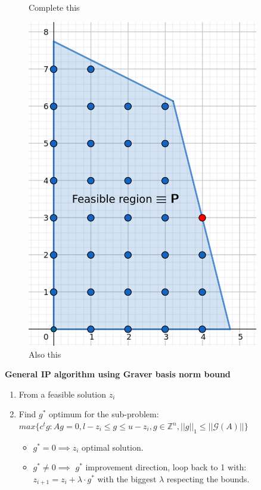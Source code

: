 \begin{figure}[h]
\begin{minipage}[b]{0.45\textwidth}
    \caption{Complete this}
\end{minipage}
\hfill
\begin{minipage}[b]{0.45\textwidth}
    \centering
    \includegraphics[width=0.9\textwidth]{images/IP(12).png}
    \caption{Also this}
\end{minipage}
\end{figure}

\newpage
\textbf{General IP algorithm using Graver basis norm bound}
\vspace{-8pt}
\begin{enumerate}
    \item From a feasible solution $z_i$
    \item Find $g^*$ optimum for the sub-problem: \vspace{4pt}\\
          $max\{c^tg : Ag = 0, l-z_i \leq g \leq u-z_i, g \in \mathbb{Z}^n, ||g||_1 \leq ||\mathcal{G}(A)|| \}$ \vspace{4pt}
    \begin{itemize}
        \item $g^* = 0 \implies z_i$ optimal solution.
        \item $g^* \neq 0 \implies$ $g^*$ improvement direction, loop back to 1 with:\\
        $z_{i+1} = z_i + \lambda \cdot g^*$ with the biggest $\lambda$ respecting the bounds.
    \end{itemize}
\end{enumerate}


